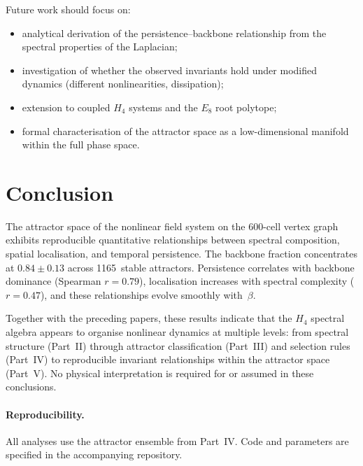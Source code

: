 \documentclass[12pt,a4paper]{article}
\newcommand{\Hfour}{H_4}
\newcommand{\Eeight}{E_8}
\begin{document}
Future work should focus on:
\begin{itemize}[nosep]
\item analytical derivation of the persistence--backbone relationship
  from the spectral properties of the Laplacian;
\item investigation of whether the observed invariants hold under
  modified dynamics (different nonlinearities, dissipation);
\item extension to coupled $\Hfour$ systems and the $\Eeight$ root
  polytope;
\item formal characterisation of the attractor space as a
  low-dimensional manifold within the full phase space.
\end{itemize}


\section{Conclusion}\label{sec:conclusion}

The attractor space of the nonlinear field system on the 600-cell
vertex graph exhibits reproducible quantitative relationships between
spectral composition, spatial localisation, and temporal persistence.
The backbone fraction concentrates at $0.84 \pm 0.13$ across
1165~stable attractors.  Persistence correlates with backbone
dominance (Spearman $r = 0.79$), localisation increases with spectral
complexity ($r = 0.47$), and these relationships evolve smoothly
with~$\beta$.

Together with the preceding papers, these results indicate that the
$\Hfour$ spectral algebra appears to organise nonlinear dynamics at
multiple levels: from spectral structure (Part~II) through attractor
classification (Part~III) and selection rules (Part~IV) to
reproducible invariant relationships within the attractor space
(Part~V).  No physical interpretation is required for or assumed in
these conclusions.

\paragraph{Reproducibility.}
All analyses use the attractor ensemble from Part~IV.  Code and
parameters are specified in the accompanying repository.
\end{document}
